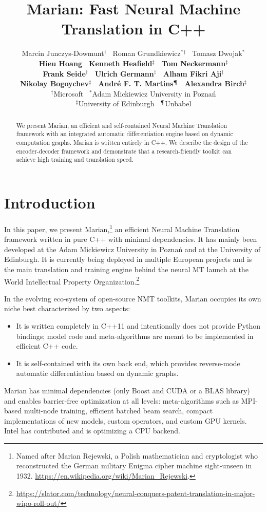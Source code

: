 \documentclass[11pt,a4paper]{article}
\title{Marian: Fast Neural Machine Translation in C++}
\author{Marcin Junczys-Dowmunt$^{\dagger}$ \, Roman Grundkiewicz$^{*}$$^{\ddagger}$ \, Tomasz Dwojak$^{*}$ \\ {\bf Hieu Hoang \, Kenneth Heafield$^{\ddagger}$ \, Tom Neckermann$^{\ddagger}$ }  \\  {\bf Frank Seide$^{\dagger}$ \, Ulrich Germann$^{\ddagger}$ \, Alham Fikri Aji$^{\ddagger}$ } \\ { \bf Nikolay Bogoychev$^{\ddagger}$ \, Andr\'{e} F. T. Martins$^{\mathparagraph}$ \, Alexandra Birch$^{\ddagger}$} \\[2mm]
  $^{\dagger}$Microsoft \, $^{*}$Adam Mickiewicz University in Pozna\'{n} \\ $^{\ddagger}$University of Edinburgh \,  $^{\mathparagraph}$Unbabel }
\date{}
\begin{document}
  \maketitle
  \begin{abstract}
  We present Marian, an efficient and self-contained Neural Machine Translation framework with an integrated automatic differentiation engine based on dynamic computation graphs. Marian is written entirely in C++. We describe the design of the encoder-decoder framework and demonstrate that a research-friendly toolkit can achieve high training and translation speed.  
  \end{abstract}

  \section{Introduction}

  In this paper, we present Marian,\footnote{Named after Marian Rejewski, a Polish mathematician and cryptologist who reconstructed the German military Enigma cipher machine sight-unseen in 1932. \url{https://en.wikipedia.org/wiki/Marian_Rejewski}.} an efficient Neural Machine Translation framework written in pure C++ with minimal dependencies. It has mainly been developed at the Adam Mickiewicz University in Pozna\'{n} and at the University of Edinburgh. It is currently being deployed in multiple European projects and is the main translation and training engine behind the neural MT launch at the World Intellectual Property Organization.\footnote{\url{https://slator.com/technology/neural-conquers-patent-translation-in-major-wipo-roll-out/}}

  In the evolving eco-system of open-source NMT toolkits, Marian occupies its own niche best characterized by two aspects:
  \begin{itemize}
  \item It is written completely in C++11 and intentionally does not provide Python bindings; model code and meta-algorithms are meant to be implemented in efficient C++ code.
  \item It is self-contained with its own back end, which provides reverse-mode automatic differentiation based on dynamic graphs.
  \end{itemize}

  Marian has minimal dependencies (only Boost and CUDA or a BLAS library) and enables barrier-free optimization at all levels: meta-algorithms such as MPI-based multi-node training, efficient batched beam search, compact implementations of new models, custom operators, and custom GPU kernels. Intel has contributed and is optimizing a CPU backend. %
\end{document}
